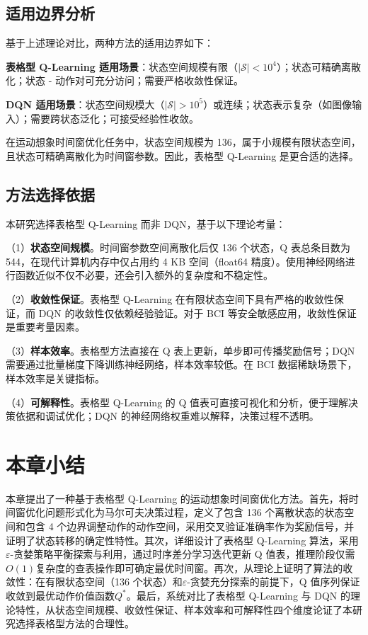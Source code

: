 \subsection{适用边界分析}
\label{subsec:applicability}

基于上述理论对比，两种方法的适用边界如下：

\textbf{表格型 Q-Learning 适用场景}：状态空间规模有限（$|\mathcal{S}| < 10^4$）；状态可精确离散化；状态 - 动作对可充分访问；需要严格收敛性保证。

\textbf{DQN 适用场景}：状态空间规模大（$|\mathcal{S}| > 10^5$）或连续；状态表示复杂（如图像输入）；需要跨状态泛化；可接受经验性收敛。

在运动想象时间窗优化任务中，状态空间规模为 136，属于小规模有限状态空间，且状态可精确离散化为时间窗参数。因此，表格型 Q-Learning 是更合适的选择。

\subsection{方法选择依据}
\label{subsec:rationale}

本研究选择表格型 Q-Learning 而非 DQN，基于以下理论考量：

（1）\textbf{状态空间规模}。时间窗参数空间离散化后仅 136 个状态，Q 表总条目数为 544，在现代计算机内存中仅占用约 4 KB 空间（float64 精度）。使用神经网络进行函数近似不仅不必要，还会引入额外的复杂度和不稳定性。

（2）\textbf{收敛性保证}。表格型 Q-Learning 在有限状态空间下具有严格的收敛性保证，而 DQN 的收敛性仅依赖经验验证。对于 BCI 等安全敏感应用，收敛性保证是重要考量因素。

（3）\textbf{样本效率}。表格型方法直接在 Q 表上更新，单步即可传播奖励信号；DQN 需要通过批量梯度下降训练神经网络，样本效率较低。在 BCI 数据稀缺场景下，样本效率是关键指标。

（4）\textbf{可解释性}。表格型 Q-Learning 的 Q 值表可直接可视化和分析，便于理解决策依据和调试优化；DQN 的神经网络权重难以解释，决策过程不透明。

\section{本章小结}

本章提出了一种基于表格型 Q-Learning 的运动想象时间窗优化方法。首先，将时间窗优化问题形式化为马尔可夫决策过程，定义了包含 136 个离散状态的状态空间和包含 4 个边界调整动作的动作空间，采用交叉验证准确率作为奖励信号，并证明了状态转移的确定性特性。其次，详细设计了表格型 Q-Learning 算法，采用$\varepsilon$-贪婪策略平衡探索与利用，通过时序差分学习迭代更新 Q 值表，推理阶段仅需$O(1)$复杂度的查表操作即可确定最优时间窗。再次，从理论上证明了算法的收敛性：在有限状态空间（136 个状态）和$\varepsilon$-贪婪充分探索的前提下，Q 值序列保证收敛到最优动作价值函数$Q^*$。最后，系统对比了表格型 Q-Learning 与 DQN 的理论特性，从状态空间规模、收敛性保证、样本效率和可解释性四个维度论证了本研究选择表格型方法的合理性。

